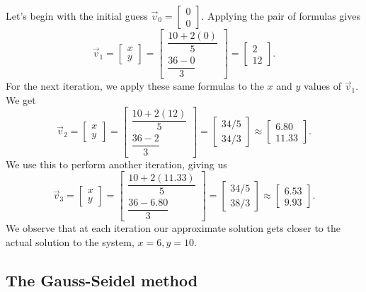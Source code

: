 \documentclass{ximera}
\begin{document}
Let's begin with the initial guess $\vec{v}_0 = \begin{bmatrix} 0\\0 \end{bmatrix}$.  Applying the pair of formulas gives
$$\vec{v}_1 = \begin{bmatrix} x\\y \end{bmatrix} = \begin{bmatrix} \dfrac{10+2(0)}{5}\\\dfrac{36-0}{3} \end{bmatrix}
= \begin{bmatrix} 2\\12 \end{bmatrix}.$$
For the next iteration, we apply these same formulas to the $x$ and $y$ values of $\vec{v}_1$.  We get
$$\vec{v}_2 = \begin{bmatrix} x\\y \end{bmatrix} = \begin{bmatrix} \dfrac{10+2(12)}{5}\\\dfrac{36-2}{3} \end{bmatrix}
= \begin{bmatrix} 34/5\\34/3 \end{bmatrix}\approx
\begin{bmatrix} 6.80\\11.33 \end{bmatrix}.$$
We use this to perform another iteration, giving us 
$$\vec{v}_3 = \begin{bmatrix} x\\y \end{bmatrix} = \begin{bmatrix} \dfrac{10+2(11.33)}{5}\\\dfrac{36-6.80}{3} \end{bmatrix}
= \begin{bmatrix} 34/5\\38/3 \end{bmatrix}\approx
\begin{bmatrix} 6.53\\9.93 \end{bmatrix}.$$
We observe that at each iteration our approximate solution gets closer to the actual solution to the system, $x=6, y=10$.

\subsection*{The Gauss-Seidel method}
\end{document}
